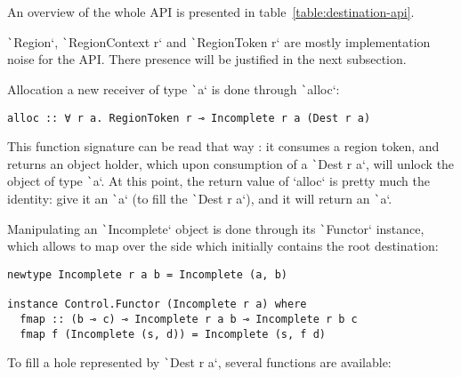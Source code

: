 \documentclass[english]{jflart}
\begin{document}
An overview of the whole API is presented in table~\ref{table:destination-api}.

\texttt`Region`, \texttt`RegionContext r` and \texttt`RegionToken r` are mostly implementation noise for the API. There presence will be justified in the next subsection.

Allocation a new receiver of type \texttt`a` is done through \texttt`alloc`:

{\small
\begin{verbatim}
alloc :: ∀ r a. RegionToken r ⊸ Incomplete r a (Dest r a)
\end{verbatim}
}

This function signature can be read that way : it consumes a region token, and returns an object holder, which upon consumption of a \texttt`Dest r a`, will unlock the object of type \texttt`a`. At this point, the return value of `alloc` is pretty much the identity: give it an \texttt`a` (to fill the \texttt`Dest r a`), and it will return an \texttt`a`.

Manipulating an \texttt`Incomplete` object is done through its \texttt`Functor` instance, which allows to map over the side which initially contains the root destination:

{\small
\begin{verbatim}
newtype Incomplete r a b = Incomplete (a, b)

instance Control.Functor (Incomplete r a) where
  fmap :: (b ⊸ c) ⊸ Incomplete r a b ⊸ Incomplete r b c
  fmap f (Incomplete (s, d)) = Incomplete (s, f d)
\end{verbatim}
}

To fill a hole represented by \texttt`Dest r a`, several functions are available:
\end{document}

